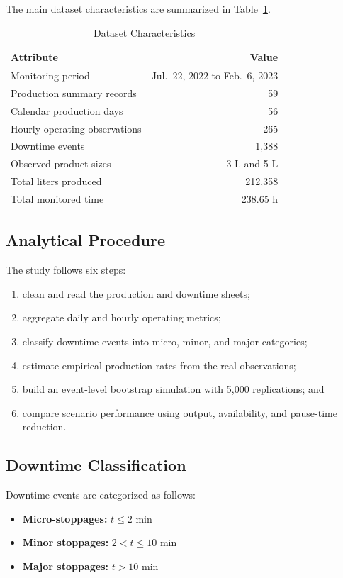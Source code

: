 \documentclass[journal]{IEEEtran}
\begin{document}
The main dataset characteristics are summarized in Table~\ref{tab:dataset}.

\begin{table}[!t]
\caption{Dataset Characteristics}
\label{tab:dataset}
\centering
\begin{tabular}{lr}
\toprule
Attribute & Value \\
\midrule
Monitoring period & Jul.\ 22, 2022 to Feb.\ 6, 2023 \\
Production summary records & 59 \\
Calendar production days & 56 \\
Hourly operating observations & 265 \\
Downtime events & 1,388 \\
Observed product sizes & 3 L and 5 L \\
Total liters produced & 212,358 \\
Total monitored time & 238.65 h \\
\bottomrule
\end{tabular}
\end{table}

\subsection{Analytical Procedure}
The study follows six steps:
\begin{enumerate}
    \item clean and read the production and downtime sheets;
    \item aggregate daily and hourly operating metrics;
    \item classify downtime events into micro, minor, and major categories;
    \item estimate empirical production rates from the real observations;
    \item build an event-level bootstrap simulation with 5,000 replications; and
    \item compare scenario performance using output, availability, and pause-time reduction.
\end{enumerate}

\subsection{Downtime Classification}
Downtime events are categorized as follows:
\begin{itemize}
    \item \textbf{Micro-stoppages:} $t \leq 2$ min
    \item \textbf{Minor stoppages:} $2 < t \leq 10$ min
    \item \textbf{Major stoppages:} $t > 10$ min
\end{itemize}
\end{document}
